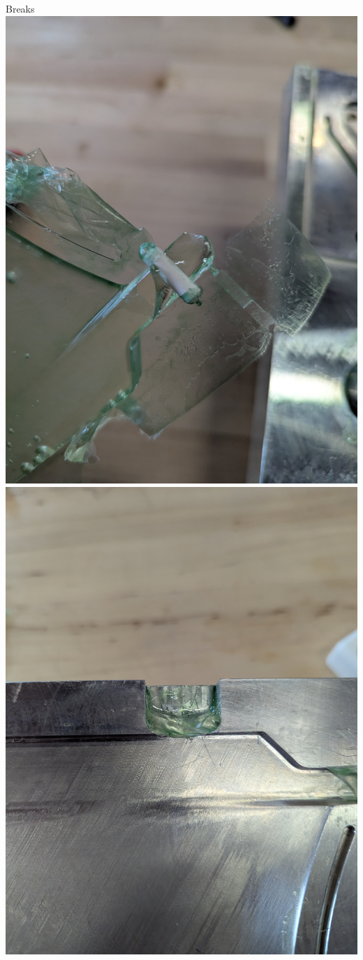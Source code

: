 \begin{frame}{Breaks}
    \includegraphics[height=0.5\textheight,keepaspectratio]{images/sf_tail_broken.jpg}
    \includegraphics[height=0.5\textheight,keepaspectratio]{images/sf_mold_tailpour_broken.jpg}

\end{frame}

